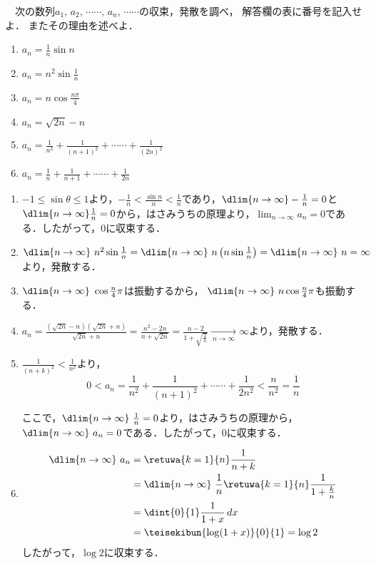 \begin{problem}
  　次の数列$a_1, \, a_2, \, \cdots\cdots, \, a_n, \, \cdots\cdots$の収束，発散を調べ，
解答欄の表に番号を記入せよ．
またその理由を述べよ．
\begin{enumerate}
\item $\displaystyle a_n=\frac{1}{n}\sin n$
\item $\displaystyle a_n=n^2\sin\frac{1}{n}$
\item $\displaystyle a_n=n\cos\frac{n\pi}{4}$
\item $a_n=\sqrt{2n}-n$
\item $\displaystyle a_n=\frac{1}{n^2}+\frac{1}{{(n+1)}^2}+\cdots\cdots+\frac{1}{{(2n)}^2}$
\item $\displaystyle a_n=\frac{1}{n}+\frac{1}{n+1}+\cdots\cdots+\frac{1}{2n}$
\end{enumerate}
\end{problem}

\noindent\kaie
\begin{enumerate}
  \item $-1 \leq \sin\theta \leq 1$より，$-\frac{1}{n} < \frac{\sin n}{n} < \frac{1}{n}$であり，$\dlim{n \to \infty} -\frac{1}{n} = 0$と$\dlim{n \to \infty} \frac{1}{n} = 0$から，はさみうちの原理より，$\lim_{n\to\infty}a_n = 0$である．したがって，$0$に収束する．

  \item
  $\dlim{n \to \infty}\ n^2 \sin \frac{1}{n}
    = \dlim{n \to \infty}\ n\left(n\sin \frac{1}{n}\right)
    = \dlim{n \to \infty}\ n
    = \infty$
  より，発散する．

  \item $\dlim{n \to \infty}\ \cos\frac{n}{4}\pi$は振動するから，
  $\dlim{n\to\infty}\ n\cos\frac{n}{4}\pi$も振動する．

  \item $a_n = \frac{(\sqrt{2n}-n)(\sqrt{2n}+n)}{\sqrt{2n}+n}
  = \frac{n^2-2n}{n+\sqrt{2n}}=\frac{n-2}{1+\sqrt{\frac{2}{n}}}\underset{\ n \to \infty\ }{\longrightarrow} \infty$より，発散する．

  \item $\frac{1}{(n+k)^2} < \frac{1}{n^2}$より，
  \[0 < a_n = \frac{1}{n^2} + \frac{1}{(n+1)^2} + \cdots\cdots + \frac{1}{2n^2} < \frac{n}{n^2} = \frac{1}{n}\]

  ここで，$\dlim{n\to\infty}\ \frac{1}{n} = 0$より，はさみうちの原理から，
  $\dlim{n\to\infty}\ a_n = 0$である．したがって，0に収束する．

  \item
  \begin{align*}
    \dlim{n\to\infty}\ a_n &= \retuwa{k=1}{n}\frac{1}{n+k} \\
    &= \dlim{n\to\infty}\ \frac{1}{n} \retuwa{k=1}{n}\frac{1}{1+\frac{k}{n}}\\
    &= \dint{0}{1}\frac{1}{1+x}\, dx\\
    &= \teisekibun{\log (1+x)}{0}{1} = \log 2
  \end{align*}
  したがって，$\log 2$に収束する．
\end{enumerate}
